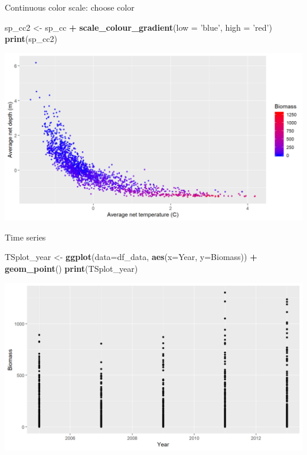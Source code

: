 \documentclass[
  ignorenonframetext,
]{beamer}
\newenvironment{Shaded}{\begin{snugshade}}{\end{snugshade}}
\newcommand{\DataTypeTok}[1]{\textcolor[rgb]{0.13,0.29,0.53}{#1}}
\newcommand{\KeywordTok}[1]{\textcolor[rgb]{0.13,0.29,0.53}{\textbf{#1}}}
\newcommand{\NormalTok}[1]{#1}
\newcommand{\OperatorTok}[1]{\textcolor[rgb]{0.81,0.36,0.00}{\textbf{#1}}}
\newcommand{\StringTok}[1]{\textcolor[rgb]{0.31,0.60,0.02}{#1}}
\begin{document}
\begin{frame}[fragile]{Continuous color scale: choose color}
\protect\hypertarget{continuous-color-scale-choose-color}{}

\begin{Shaded}
\begin{Highlighting}[]
\NormalTok{sp_cc2 <-}\StringTok{ }\NormalTok{sp_cc }\OperatorTok{+}
\StringTok{  }\KeywordTok{scale_colour_gradient}\NormalTok{(}\DataTypeTok{low =} \StringTok{'blue'}\NormalTok{, }\DataTypeTok{high =} \StringTok{'red'}\NormalTok{)}
\KeywordTok{print}\NormalTok{(sp_cc2)}
\end{Highlighting}
\end{Shaded}

\begin{center}\includegraphics[width=0.8\linewidth]{figure/sp_continuous_color2-1} \end{center}

\end{frame}

\begin{frame}[fragile]{Time series}
\protect\hypertarget{time-series}{}

\begin{Shaded}
\begin{Highlighting}[]
\NormalTok{TSplot_year <-}\StringTok{ }\KeywordTok{ggplot}\NormalTok{(}\DataTypeTok{data=}\NormalTok{df_data, }\KeywordTok{aes}\NormalTok{(}\DataTypeTok{x=}\NormalTok{Year, }\DataTypeTok{y=}\NormalTok{Biomass)) }\OperatorTok{+}\StringTok{ }
\StringTok{  }\KeywordTok{geom_point}\NormalTok{()}
\KeywordTok{print}\NormalTok{(TSplot_year)}
\end{Highlighting}
\end{Shaded}

\begin{center}\includegraphics[width=0.8\linewidth]{figure/sp_TSplot_year-1} \end{center}

\end{frame}
\end{document}
